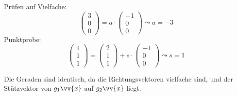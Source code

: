 \documentclass[a4paper, 15pt]{article}
\begin{document}
Prüfen auf Vielfache:
\begin{equation*}
\left(\begin{array}{c} 3 \\ 0 \\ 0 \end{array}\right) = a \cdot \left(\begin{array}{c} -1 \\ 0 \\ 0 \end{array}\right) \leadsto a = -3
\end{equation*}
Punktprobe:
\begin{equation*}
\left(\begin{array}{c} 1 \\ 1 \\ 1 \end{array}\right) = \left(\begin{array}{c} 2 \\ 1 \\ 1 \end{array}\right) + s \cdot \left(\begin{array}{c} -1 \\ 0 \\ 0 \end{array}\right) \leadsto s = 1
\end{equation*}
\begin{center}
Die Geraden sind identisch, da die Richtungsvektoren vielfache sind, und der Stützvektor von $g_1\vv{x}$ auf $g_2\vv{x}$ liegt.
\end{center}
\end{document}
